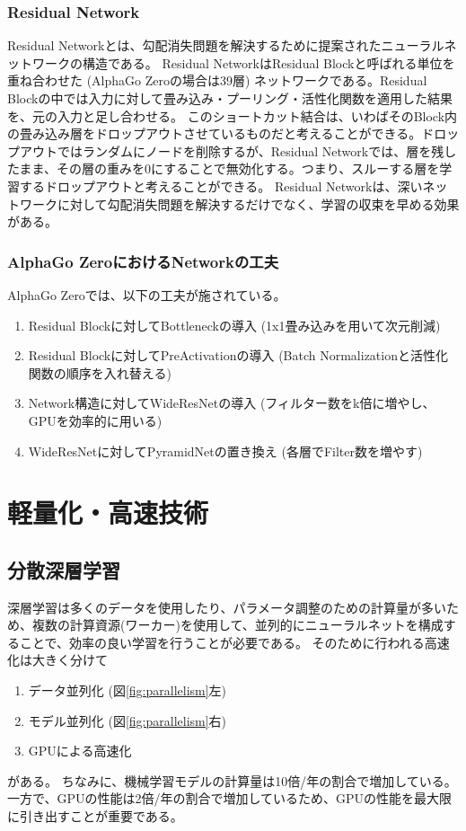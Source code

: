 \documentclass{ltjsarticle}
\begin{document}
\subsubsection{Residual Network}
Residual Networkとは、勾配消失問題を解決するために提案されたニューラルネットワークの構造である。
Residual NetworkはResidual Blockと呼ばれる単位を重ね合わせた (AlphaGo Zeroの場合は39層) ネットワークである。Residual Blockの中では入力に対して畳み込み・プーリング・活性化関数を適用した結果を、元の入力と足し合わせる。
このショートカット結合は、いわばそのBlock内の畳み込み層をドロップアウトさせているものだと考えることができる。ドロップアウトではランダムにノードを削除するが、Residual Networkでは、層を残したまま、その層の重みを0にすることで無効化する。つまり、スルーする層を学習するドロップアウトと考えることができる。
Residual Networkは、深いネットワークに対して勾配消失問題を解決するだけでなく、学習の収束を早める効果がある。

\subsubsection{AlphaGo ZeroにおけるNetworkの工夫}
AlphaGo Zeroでは、以下の工夫が施されている。
\begin{enumerate}
  \item Residual Blockに対してBottleneckの導入 (1x1畳み込みを用いて次元削減)
  \item Residual Blockに対してPreActivationの導入 (Batch Normalizationと活性化関数の順序を入れ替える)
  \item Network構造に対してWideResNetの導入 (フィルター数をk倍に増やし、GPUを効率的に用いる)
  \item WideResNetに対してPyramidNetの置き換え (各層でFilter数を増やす)
\end{enumerate}

\clearpage
\section{軽量化・高速技術}
\subsection{分散深層学習}
深層学習は多くのデータを使用したり、パラメータ調整のための計算量が多いため、複数の計算資源(ワーカー)を使用して、並列的にニューラルネットを構成することで、効率の良い学習を行うことが必要である。
そのために行われる高速化は大きく分けて
\begin{enumerate}
  \item データ並列化 (図\ref{fig:parallelism}左)
  \item モデル並列化 (図\ref{fig:parallelism}右)
  \item GPUによる高速化
\end{enumerate}
がある。
ちなみに、機械学習モデルの計算量は10倍/年の割合で増加している。一方で、GPUの性能は2倍/年の割合で増加しているため、GPUの性能を最大限に引き出すことが重要である。
\end{document}
